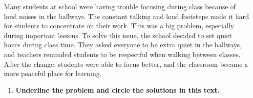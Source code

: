 \documentclass[12pt]{article}
\begin{document}
\vspace {0.3cm}
\begin{tcolorbox}[colframe=black!60, colback=white, 
coltitle=black, colbacktitle=black!15, fonttitle=\bfseries\Large, 
title=Guided Practice, halign title=center, left=10pt, right=10pt, top=10pt, bottom=15pt]


Many students at school were having trouble focusing during class because of loud noises in the hallways. The constant talking and loud footsteps made it hard for students to concentrate on their work. This was a big problem, especially during important lessons. To solve this issue, the school decided to set quiet hours during class time. They asked everyone to be extra quiet in the hallways, and teachers reminded students to be respectful when walking between classes. After the change, students were able to focus better, and the classroom became a more peaceful place for learning. 

 

\begin{enumerate}[itemsep=3em]
   \item \textbf{Underline the problem and circle the solutions in this text.}
\end{enumerate}
\end{tcolorbox}
\end{document}
